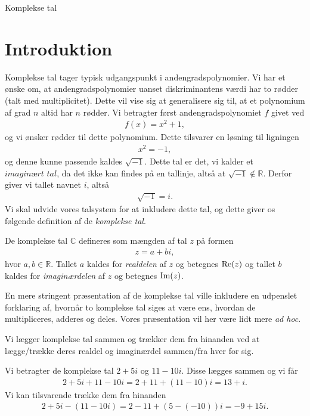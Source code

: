 \begin{center}
\Huge
	Komplekse tal
\end{center}

\section*{Introduktion}

Komplekse tal tager typisk udgangspunkt i andengradspolynomier. Vi har et ønske om, at andengradspolynomier uanset diskriminantens værdi har to rødder (talt med multiplicitet). Dette vil vise sig at generalisere sig til, at et polynomium af grad $n$ altid har $n$ rødder. Vi betragter først andengradspolynomiet $f$ givet ved
\begin{align*}
	f(x) = x^2 + 1,
\end{align*}
og vi ønsker rødder til dette polynomium. Dette tilsvarer en løsning til ligningen
\begin{align*}
	x^2 = -1,
\end{align*}
og denne kunne passende kaldes $\sqrt{-1}$. Dette tal er det, vi kalder et $\textit{imaginært tal}$, da det ikke kan findes på en tallinje, altså at $\sqrt{-1}\notin \mathbb{R}$. Derfor giver vi tallet navnet $i$, altså
\begin{align*}
	\sqrt{-1} = i.
\end{align*}
Vi skal udvide vores talsystem for at inkludere dette tal, og dette giver os følgende definition af de \textit{komplekse tal}.
\begin{defn}
	De komplekse tal $\mathbb{C}$ defineres som mængden af tal $z$ på formen
	\begin{align*}
		z = a + bi,
	\end{align*}
	hvor $a,b\in \mathbb{R}$. Tallet $a$ kaldes for \textit{realdelen} af $z$ og betegnes $\textnormal{Re}(z)$
	 og tallet $b$ kaldes for \textit{imaginærdelen} af $z$ og betegnes $\textnormal{Im}(z)$.
\end{defn}
En mere stringent præsentation af de komplekse tal ville inkludere en udpenslet forklaring af, hvornår to komplekse tal siges at være ens, hvordan de multipliceres, adderes og deles. Vores præsentation vil her være lidt mere \textit{ad hoc}.

Vi lægger komplekse tal sammen og trækker dem fra hinanden ved at lægge/trække deres realdel og imaginærdel sammen/fra hver for sig.
\begin{exa}
	Vi betragter de komplekse tal $2 + 5i$ og $11-10i$. Disse lægges sammen og vi får
	\begin{align*}
		2 + 5i + 11 - 10i = 2+11 + (11-10)i = 13 + i.
	\end{align*}
	Vi kan tilsvarende trække dem fra hinanden
	\begin{align*}
		2 + 5i -(11 - 10i) = 2 - 11 + (5-(-10))i = -9 + 15i. 
	\end{align*}
\end{exa}

